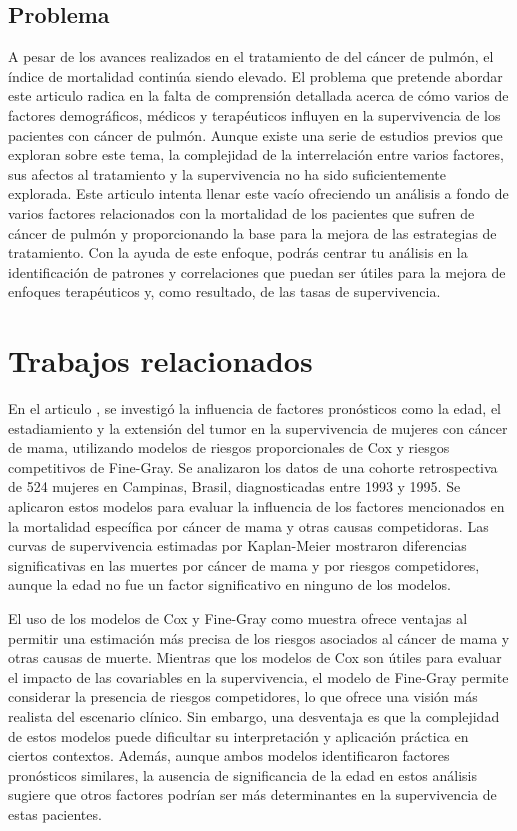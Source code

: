 \documentclass[10pt,journal,compsoc]{IEEEtran}
\begin{document}
\subsection{Problema}
A pesar de los avances realizados en el tratamiento de del cáncer de pulmón, el índice de mortalidad continúa siendo elevado. El problema que pretende abordar este articulo radica en la falta de comprensión detallada acerca de cómo varios de factores demográficos, médicos y terapéuticos influyen en la supervivencia de los pacientes con cáncer de pulmón. Aunque existe una serie de estudios previos que exploran sobre este tema, la complejidad de la interrelación entre varios factores, sus afectos al tratamiento y la supervivencia no ha sido suficientemente explorada. Este articulo intenta llenar este vacío ofreciendo un análisis a fondo de varios factores relacionados con la mortalidad de los pacientes que sufren de cáncer de pulmón y proporcionando la base para la mejora de las estrategias de tratamiento. Con la ayuda de este enfoque, podrás centrar tu análisis en la identificación de patrones y correlaciones que puedan ser útiles para la mejora de enfoques terapéuticos y, como resultado, de las tasas de supervivencia.


\section{Trabajos relacionados}

En el articulo \cite{ferraz2017}, se investigó la influencia de factores pronósticos como la edad, el estadiamiento y la extensión del tumor en la supervivencia de mujeres con cáncer de mama, utilizando modelos de riesgos proporcionales de Cox y riesgos competitivos de Fine-Gray. Se analizaron los datos de una cohorte retrospectiva de 524 mujeres en Campinas, Brasil, diagnosticadas entre 1993 y 1995. Se aplicaron estos modelos para evaluar la influencia de los factores mencionados en la mortalidad específica por cáncer de mama y otras causas competidoras. Las curvas de supervivencia estimadas por Kaplan-Meier mostraron diferencias significativas en las muertes por cáncer de mama y por riesgos competidores, aunque la edad no fue un factor significativo en ninguno de los modelos.

El uso de los modelos de Cox y Fine-Gray como muestra \cite{ferraz2017} ofrece ventajas al permitir una estimación más precisa de los riesgos asociados al cáncer de mama y otras causas de muerte. Mientras que los modelos de Cox son útiles para evaluar el impacto de las covariables en la supervivencia, el modelo de Fine-Gray permite considerar la presencia de riesgos competidores, lo que ofrece una visión más realista del escenario clínico. Sin embargo, una desventaja es que la complejidad de estos modelos puede dificultar su interpretación y aplicación práctica en ciertos contextos. Además, aunque ambos modelos identificaron factores pronósticos similares, la ausencia de significancia de la edad en estos análisis sugiere que otros factores podrían ser más determinantes en la supervivencia de estas pacientes.
\end{document}
